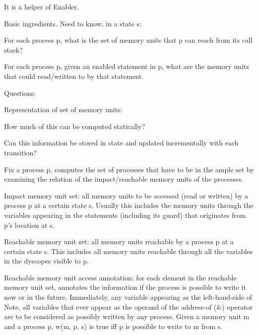 It is a helper of Enabler.

Basic ingredients. Need to know, in a state s\+:

For each process p, what is the set of memory units that p can reach from its call stack?

For each process p, given an enabled statement in p, what are the memory units that could read/written to by that statement.

Questions\+:

Representation of set of memory units\+:

How much of this can be computed statically?

Can this information be stored in state and updated incrementally with each transition?


\begin{DoxyPre}
Fix a process {\ttfamily p}, computes the set of processes that have to be
in the ample set by examining the relation of the impact/reachable memory
units of the processes.\end{DoxyPre}



\begin{DoxyPre}Impact memory unit set: all memory units to be accessed (read or written) by a
process {\ttfamily p} at a certain state {\ttfamily s}. Usually this
includes the memory units through the variables appearing in the statements 
(including its guard) that originates from {\ttfamily p}'s location at 
{\ttfamily s}.\end{DoxyPre}



\begin{DoxyPre}Reachable memory unit set: all memory units reachable by a process
{\ttfamily p} at a certain state {\ttfamily s}. This includes all memory units 
reachable through all the variables in the dyscopes visible to {\ttfamily p}.\end{DoxyPre}



\begin{DoxyPre}Reachable memory unit access annotation: for each element in the reachable memory
unit set, annotates the information if the process is possible to write it now or
in the future. Immediately, any variable appearing as the left-hand-side of
Note, all variables that ever appear as the operand of the address-of (\&)
operator are to be considered as possibly written by any process. Given a memory 
unit {\ttfamily m} and a process {\ttfamily p}, {\ttfamily w(m, p, s)} is true 
iff {\ttfamily p} is possible to write to {\ttfamily m} from {\ttfamily s}.\end{DoxyPre}



